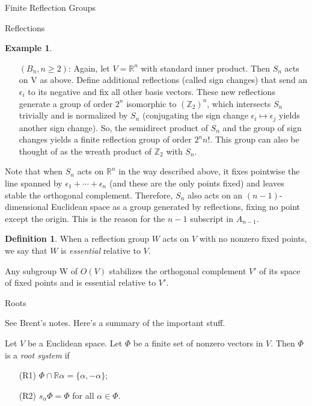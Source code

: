 \documentclass[12pt]{nauthesis}
\theoremstyle{definition}
\newtheorem{definition}[theorem]{Definition}
\newtheorem{example}[theorem]{Example}
\newcommand{\Z}{\mathbb{Z}}
\newcommand{\R}{\mathbb{R}}
\renewcommand{\(}{\big(}
\renewcommand{\)}{\big)}
\begin{document}
\begin{flushleft}
\begin{chapter}{Finite Reflection Groups}
\begin{section}{Reflections}
\begin{example}
\begin{enumerate}
\item[] $(B_n, n \geq 2)$:  Again, let $V=\R^n$ with standard inner product.  Then $S_n$ acts on V as above.  Define additional reflections (called sign changes) that send an $\epsilon_i$ to its negative and fix all other basis vectors.  These new reflections generate a group of order $2^n$ isomorphic to $(\Z_2)^n$, which intersects $S_n$ trivially and is normalized by $S_n$ (conjugating the sign change $\epsilon_i \mapsto \epsilon_j$ yields another sign change).  So, the semidirect product of $S_n$ and the group of sign changes yields a finite reflection group of order $2^n n!$.  This group can also be thought of as the wreath product of $\Z_2$ with $S_n$.
\end{enumerate}
\end{example}

\medskip

Note that when $S_n$ acts on $\R^n$ in the way described above, it fixes pointwise the line spanned by $\epsilon_1 + \cdots + \epsilon_n$ (and these are the only points fixed) and leaves stable the orthogonal complement.  Therefore, $S_n$ also acts on an $(n-1)$-dimensional Euclidean space as a group generated by reflections, fixing no point except the origin.  This is the reason for the $n-1$ subscript in $A_{n-1}$.

\medskip

\begin{definition}
When a reflection group $W$ acts on $V$ with no nonzero fixed points, we say that $W$ is {\it essential} relative to $V$.
\end{definition}

\medskip

Any subgroup W of $O(V)$ stabilizes the orthogonal complement $V'$ of its space of fixed points and is essential relative to $V'$.

\end{section}

\newpage

\begin{section}{Roots}

See Brent's notes.  Here's a summary of the important stuff.

\medskip

Let $V$ be a Euclidean space.  Let $\Phi$ be a finite set of nonzero vectors in $V$.  Then $\Phi$ is a \emph{root system} if
\begin{enumerate}
  \item[(R1)] $\Phi \cap \R \alpha = \{\alpha, -\alpha\}$;
  \item[(R2)] $s_\alpha \Phi = \Phi$ for all $\alpha \in \Phi$.
\end{enumerate}


\end{section}
\end{chapter}
\end{flushleft}
\end{document}

